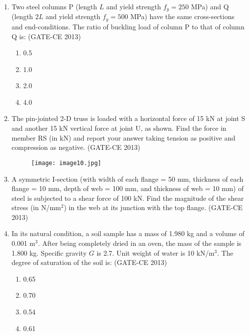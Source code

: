\documentclass[journal,12pt,onecolumn]{article}
\theoremstyle{remark}
\begin{document}
\begin{enumerate}
    \item Two steel columns P (length $L$ and yield strength $f_y = 250$ MPa) and Q (length $2L$ and yield strength $f_y = 500$ MPa) have the same cross-sections and end-conditions. The ratio of buckling load of column P to that of column Q is: (GATE-CE 2013)
    \begin{multicols}{4}
    \begin{enumerate}
        \item 0.5 
        \item 1.0 
        \item 2.0 
        \item 4.0
    \end{enumerate}
    \end{multicols}
    
    \item The pin-jointed 2-D truss is loaded with a horizontal force of 15 kN at joint S and another 15 kN vertical force at joint U, as shown. Find the force in member RS (in kN) and report your answer taking tension as positive and compression as negative. \underline{\hspace{3cm}} (GATE-CE 2013)
    
    \begin{figure}[H]
    \centering
    \texttt{[image: image10.jpg]}  
    \caption{}
    \label{fig:1}
    \end{figure}
    
    \item A symmetric I-section (with width of each flange = 50 mm, thickness of each flange = 10 mm, depth of web = 100 mm, and thickness of web = 10 mm) of steel is subjected to a shear force of 100 kN. Find the magnitude of the shear stress (in N/mm$^2$) in the web at its junction with the top flange. \underline{\hspace{3cm}} (GATE-CE 2013)
    
    \item In its natural condition, a soil sample has a mass of 1.980 kg and a volume of 0.001 m$^3$. After being completely dried in an oven, the mass of the sample is 1.800 kg. Specific gravity $G$ is 2.7. Unit weight of water is 10 kN/m$^3$. The degree of saturation of the soil is: (GATE-CE 2013)
    \begin{multicols}{4}
    \begin{enumerate}
        \item 0.65 
        \item 0.70 
        \item 0.54 
        \item 0.61
    \end{enumerate}
    \end{multicols}
    

\end{enumerate}
\end{document}

